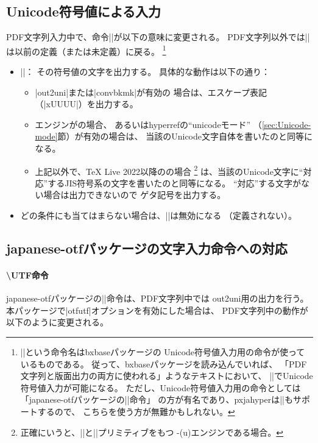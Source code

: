 \documentclass[uplatex,dvipdfmx,a4paper]{jsarticle}
\newcommand{\Pkg}[1]{\textsf{#1}}
\newcommand{\Meta}[1]{$\langle$\mbox{}#1\mbox{}$\rangle$}
\newcommand{\Means}{：\quad}
\begin{document}
\subsection{Unicode符号値による入力}
\label{ssec:ux-command}

PDF文字列入力中で、命令|\Ux|が以下の意味に変更される。
PDF文字列以外では|\Ux|は以前の定義（または未定義）に戻る。
\footnote{|\Ux|という命令名は\Pkg{bxbase}パッケージの
Unicode符号値入力用の命令が使っているものである。
従って、\Pkg{bxbase}パッケージを読み込んでいれば、
「PDF文字列と版面出力の両方に使われる」ようなテキストにおいて、
|\Ux|でUnicode符号値入力が可能になる。
ただし、Unicode符号値入力用の命令としては
「\Pkg{japanese-otf}パッケージの|\UTF|命令」
の方が有名であり、\Pkg{pxjahyper}は|\UTF|もサポートするので、
こちらを使う方が無難かもしれない。}

\begin{itemize}
\item |\Ux{|\Meta{Unicode符号値16進}|}|\Means
  その符号値の文字を出力する。
  具体的な動作は以下の通り：
  \begin{itemize}
  \item |out2uni|または|convbkmk|が有効の
  場合は、エスケープ表記（|\0xUUUU|）を出力する。
  \item エンジンが{\upLaTeX}の場合、
  あるいは\Pkg{hyperref}の“unicodeモード”
  （\ref{sec:Unicode-mode}節）が有効の場合は、
  当該のUnicode文字自体を書いたのと同等になる。
  \item 上記以外で、{\TeX} Live 2022以降の{\pLaTeX}の場合
  \footnote{正確にいうと、|\Uchar|と|\ucs|プリミティブをもつ
    {\TLe-(u)\pTeX}エンジンである場合。}%
  は、当該のUnicode文字に“対応”するJIS符号系の文字を書いたのと同等になる。
  “対応”する文字がない場合は出力できないので
  ゲタ記号を出力する。
  \end{itemize}
  \item どの条件にも当てはまらない場合は、|\Ux|は無効になる
  （定義されない）。
\end{itemize}

\subsection{\Pkg{japanese-otf}パッケージの文字入力命令への対応}
\label{ssec:otf-package}

\paragraph{\textbackslash UTF命令}
\Pkg{japanese-otf}パッケージの|\UTF|命令は、PDF文字列中では
out2uni用の出力を行う。
本パッケージで|otfutf|オプションを有効にした場合は、
PDF文字列中の動作が以下のように変更される。
\end{document}
